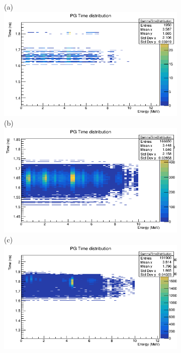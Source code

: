 \documentclass[11pt,a4paper,oldfontcommands]{memoir}
\begin{document}
\begin{figure}
\begin{figure}[h!]

\centering
\subfloat(a){\includegraphics[scale=0.3]{Parodi/PG/away.png}}
\subfloat(b){\includegraphics[scale=0.3]{Parodi/PG/preBragg.png}}\\
\subfloat(c){\includegraphics[scale=0.3]{Parodi/PG/Bragg.png}}
    

\end{figure}
\end{figure}
\end{document}

